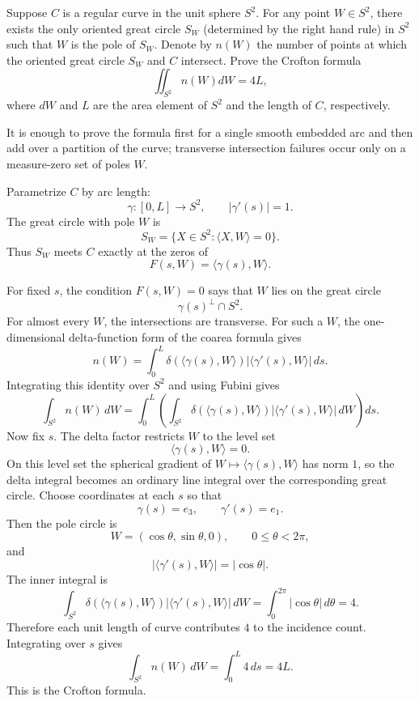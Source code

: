 \begin{exercise}
\label{geometry:2018:4}
Suppose $C$ is a regular curve in the unit sphere $S^2$. For any point $W \in S^2$, there exists the only oriented great circle $S_W$ (determined by the right hand rule) in $S^2$ such that $W$ is the pole of $S_W$. Denote by $n(W)$ the number of points at which the oriented great circle $S_W$ and $C$ intersect. Prove the Crofton formula
\[
\iint_{S^2} n(W) dW = 4L,
\]
where $dW$ and $L$ are the area element of $S^2$ and the length of $C$, respectively.
\end{exercise}

\begin{solution}
It is enough to prove the formula first for a single smooth embedded arc and then add over a partition of the curve; transverse intersection failures occur only on a measure-zero set of poles $W$.

Parametrize $C$ by arc length:
\[
\gamma:[0,L]\to S^2,\qquad |\gamma'(s)|=1.
\]
The great circle with pole $W$ is
\[
S_W=\{X\in S^2:\langle X,W\rangle=0\}.
\]
Thus $S_W$ meets $C$ exactly at the zeros of
\[
F(s,W)=\langle \gamma(s),W\rangle.
\]

For fixed $s$, the condition $F(s,W)=0$ says that $W$ lies on the great circle
\[
\gamma(s)^\perp\cap S^2.
\]
For almost every $W$, the intersections are transverse. For such a $W$, the one-dimensional delta-function form of the coarea formula gives
\[
n(W)=\int_0^L
\delta(\langle \gamma(s),W\rangle)
|\langle \gamma'(s),W\rangle|\,ds.
\]
Integrating this identity over $S^2$ and using Fubini gives
\[
\int_{S^2}n(W)\,dW
=
\int_0^L
\left(
\int_{S^2}
\delta(\langle \gamma(s),W\rangle)
|\langle \gamma'(s),W\rangle|\,dW
\right)ds.
\]
Now fix $s$. The delta factor restricts $W$ to the level set
\[
\langle \gamma(s),W\rangle=0.
\]
On this level set the spherical gradient of $W\mapsto \langle \gamma(s),W\rangle$ has norm $1$, so the delta integral becomes an ordinary line integral over the corresponding great circle.
Choose coordinates at each $s$ so that
\[
\gamma(s)=e_3,\qquad \gamma'(s)=e_1.
\]
Then the pole circle is
\[
W=(\cos\theta,\sin\theta,0),
\qquad 0\leq \theta<2\pi,
\]
and
\[
|\langle \gamma'(s),W\rangle|=|\cos\theta|.
\]
The inner integral is
\[
\int_{S^2}\delta(\langle \gamma(s),W\rangle)
|\langle \gamma'(s),W\rangle|\,dW
=\int_0^{2\pi}|\cos\theta|\,d\theta=4.
\]
Therefore each unit length of curve contributes $4$ to the incidence count. Integrating over $s$ gives
\[
\int_{S^2} n(W)\,dW
=\int_0^L 4\,ds
=4L.
\]
This is the Crofton formula.
\end{solution}

